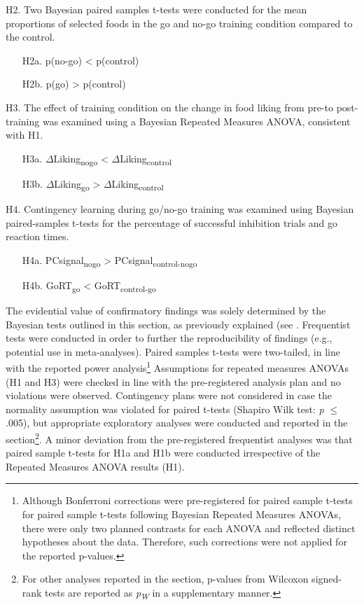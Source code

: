 \documentclass[man,floatsintext]{apa6}
\let\rmarkdownfootnote\footnote%
\def\footnote{\protect\rmarkdownfootnote}
\begin{document}
\noindent H2. Two Bayesian paired samples t-tests were conducted for the mean proportions of selected foods in the go and no-go training condition compared to the control.

\begin{itemize}
\item[H2a.] p(no-go) < p(control)
\item[H2b.] p(go) > p(control)
\end{itemize}

\noindent H3. The effect of training condition on the change in food liking from pre-to post-training was examined using a Bayesian Repeated Measures ANOVA, consistent with H1.

\begin{itemize}
\item[H3a.] $\Delta$Liking\textsubscript{nogo} < $\Delta$Liking\textsubscript{control}
\item[H3b.] $\Delta$Liking\textsubscript{go} > $\Delta$Liking\textsubscript{control}
\end{itemize}

\noindent H4. Contingency learning during go/no-go training was examined using Bayesian paired-samples t-tests for the percentage of successful inhibition trials and go reaction times.

\begin{itemize}
\item[H4a.] PCsignal\textsubscript{nogo} > PCsignal\textsubscript{control-nogo}
\item[H4b.] GoRT\textsubscript{go} < GoRT\textsubscript{control-go}
\end{itemize}

The evidential value of confirmatory findings was solely determined by the Bayesian tests outlined in this section, as previously explained (see \textit{}. Frequentist tests were conducted in order to further the reproducibility of findings (e.g., potential use in meta-analyses). Paired samples t-tests were two-tailed, in line with the reported power analysis\footnote{Although Bonferroni corrections were pre-registered for paired sample t-tests for paired sample t-tests following Bayesian Repeated Measures ANOVAs, there were only two planned contrasts for each ANOVA and reflected distinct hypotheses about the data. Therefore, such corrections were not applied for the reported p-values.} Assumptions for repeated measures ANOVAs (H1 and H3) were checked in line with the pre-registered analysis plan and no violations were observed. Contingency plans were not considered in case the normality assumption was violated for paired t-tests (Shapiro Wilk test: \emph{p} \(\leq\) .005), but appropriate exploratory analyses were conducted and reported in the \textit{} section\footnote{For other analyses reported in the \textit{} section, p-values from Wilcoxon signed-rank tests are reported as \textit{p\textsubscript{W}} in a supplementary manner.}. A minor deviation from the pre-registered frequentist analyses was that paired sample t-tests for H1a and H1b were conducted irrespective of the Repeated Measures ANOVA results (H1).
\end{document}
